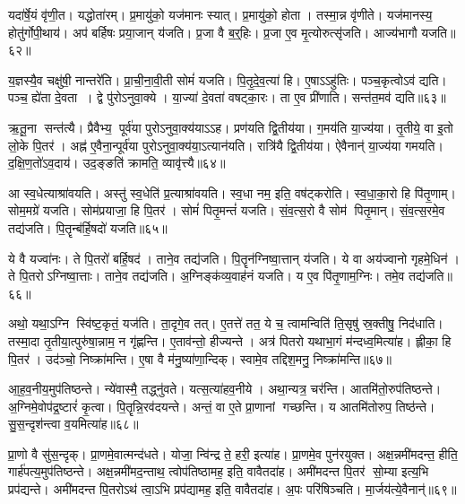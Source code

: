यदा॑र्\mbox{}षे॒यं वृ॑णी॒त।
यद्धोता॑रम्।
प्र॒मायु॑को॒ यज॑मानः स्यात्।
प्र॒मायु॑को॒ होता।
तस्मा॒न्न वृ॑णीते।
यज॑मानस्य॒ होतु॑र्गोपी॒थाय॑।
अप॑ बर्\mbox{}हिषः प्रया॒जान् य॑जति।
प्र॒जा वै ब॒र्॒हिः।
प्र॒जा ए॒व मृ॒त्योरुत्सृ॑जति।
आज्य॑भागौ यजति॥६२॥

य॒ज्ञस्यै॒व चक्षु॑षी॒ नान्तरे॑ति।
प्रा॒ची॒ना॒वी॒ती सोमं॑ यजति।
पि॒तृ॒दे॒व॒त्या॑ हि।
ए॒षाऽऽहु॑तिः।
पञ्च॒कृत्वोऽव॑ द्यति।
पञ्च॒ ह्ये॑ता दे॒वता।
द्वे पु॑रोऽनुवा॒क्ये।
या॒ज्या॑ दे॒वता॑ वषट्का॒रः।
ता ए॒व प्री॑णाति।
सन्त॑त॒मव॑ द्यति॥६३॥

ऋ॒तू॒ना सन्त॑त्यै।
प्रैवैभ्य॒ पूर्व॑या पुरोऽनुवा॒क्य॑याऽऽह।
प्रण॑यति द्वि॒तीय॑या।
ग॒मय॑ति या॒ज्य॑या।
तृ॒तीये॒ वा इ॒तो लो॒के पि॒तर॑।
अह्न॑ ए॒वैना॒न्पूर्व॑या पुरोऽनुवा॒क्य॑या॒ऽत्यान॑यति।
रात्रि॑यै द्वि॒तीय॑या।
ऐवैनान्॑ या॒ज्य॑या गमयति।
द॒क्षि॒ण॒तो॑ऽव॒दाय॑।
उद॒ङ्ङति॑ क्रामति॒ व्यावृ॑त्त्यै॥६४॥

आ स्व॒धेत्याश्रा॑वयति।
अस्तु॑ स्व॒धेति॑ प्र॒त्याश्रा॑वयति।
स्व॒धा नम॒ इति॒ वष॑ट्करोति।
स्व॒धा॒का॒रो हि पि॑तृ॒णाम्।
सोम॒मग्रे॑ यजति।
सोम॑प्रयाजा॒ हि पि॒तर॑।
सोमं॑ पितृ॒मन्तं॑ यजति।
सं॒व॒त्स॒रो वै सोम॑ पितृ॒मान्।
सं॒व॒त्स॒रमे॒व तद्य॑जति।
पि॒तॄन्ब॑र्\mbox{}हि॒षदो॑ यजति॥६५॥

ये वै यज्वा॑नः।
ते पि॒तरो॑ बर्\mbox{}हि॒षद॑।
ताने॒व तद्य॑जति।
पि॒तॄन॑ग्निष्वा॒त्तान् य॑जति।
ये वा अय॑ज्वानो गृहमे॒धिन॑।
ते पि॒तरोऽग्निष्वा॒त्ताः।
ताने॒व तद्य॑जति।
अ॒ग्निङ्क॑व्य॒वाह॑नं यजति।
य ए॒व पि॑तृ॒णाम॒ग्निः।
तमे॒व तद्य॑जति॥६६॥

अथो॒ यथा॒ऽग्नि स्वि॑ष्ट॒कृतं॒ यज॑ति।
ता॒दृगे॒व तत्।
ए॒तत्ते॑ तत॒ ये च॒ त्वामन्विति॑ ति॒सृषु॑ स्र॒क्तीषु॒ निद॑धाति।
तस्मा॒दा तृ॒तीया॒त्पुरु॑षा॒न्नाम॒ न गृ॑ह्णन्ति।
ए॒ताव॑न्तो॒ हीज्यन्ते।
अत्र॑ पितरो यथाभा॒गं म॑न्दध्व॒मित्या॑ह।
ह्लीका॒ हि पि॒तर॑।
उद॑ञ्चो॒ निष्क्रा॑मन्ति।
ए॒षा वै म॑नु॒ष्या॑णा॒न्दिक्।
स्वामे॒व तद्दिश॒मनु॒ निष्क्रा॑मन्ति॥६७॥

आ॒ह॒व॒नीय॒मुप॑तिष्ठन्ते।
न्ये॑वास्मै॒ तद्ध्नु॑वते।
यत्स॒त्या॑हव॒नीये।
अथा॒न्यत्र॒ चर॑न्ति।
आतमि॑तो॒रुप॑तिष्ठन्ते।
अ॒ग्निमे॒वोप॑द्र॒ष्टारं॑ कृ॒त्वा।
पि॒तॄन्नि॒रव॑दयन्ते।
अन्तं॒ वा ए॒ते प्रा॒णानां गच्छन्ति।
य आतमि॑तोरुप॒ तिष्ठ॑न्ते।
सु॒स॒न्दृश॑न्त्वा व॒यमित्या॑ह॥६८॥

प्रा॒णो वै सु॑स॒न्दृक्।
प्रा॒णमे॒वात्मन्द॑धते।
योजा॒ न्वि॑न्द्र ते॒ हरी॒ इत्या॑ह।
प्रा॒णमे॒व पुन॑रयुक्त।
अक्ष॒न्नमी॑मदन्त॒ हीति॒ गार्\mbox{}ह॑पत्य॒मुप॑तिष्ठन्ते।
अक्ष॒न्नमी॑मद॒न्ताथ॒ त्वोप॑तिष्ठामह॒ इति॒ वावैतदा॑ह।
अमी॑मदन्त पि॒तर॑ सो॒म्या इत्य॒भि प्रप॑द्यन्ते।
अमी॑मदन्त पि॒तरोऽथ॑ त्वा॒ऽभि प्रप॑द्यामह॒ इति॒ वावैतदा॑ह।
अ॒पः परि॑षिञ्चति।
मा॒र्जय॑त्ये॒वैनान्॑॥६९॥

